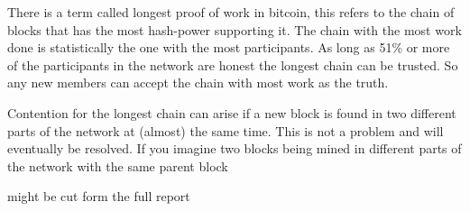 There is a term called longest proof of work in bitcoin, this refers to the chain of blocks that has the most hash-power supporting it. The chain with the most work done is statistically the one with the most participants. As long as 51\% or more of the participants in the network are honest the longest chain can be trusted. So any new members can accept the chain with most work as the truth. 

Contention for the longest chain can arise if a new block is found in two different parts of the network at (almost) the same time. This is not a problem and will eventually be resolved. If you imagine two blocks being mined in different parts of the network with the same parent block 



might be cut form the full report



